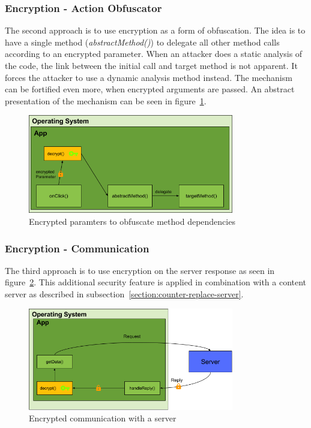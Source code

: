 \subsubsection{Encryption - Action Obfuscator} \label{subsubsectionection:counter-replace-encryption-content-obfuscator}
The second approach is to use encryption as a form of obfuscation.
The idea is to have a single method (\textit{abstractMethod()}) to delegate all other method calls according to an encrypted parameter.
\newline
When an attacker does a static analysis of the code, the link between the initial call and target method is not apparent.
It forces the attacker to use a dynamic analysis method instead.
The mechanism can be fortified even more, when encrypted arguments are passed.
\newline
An abstract presentation of the mechanism can be seen in figure~\ref{fig:encryptionAction}.
\begin{figure}[h]
    \centering
    \includegraphics[width=0.8\textwidth]{data/encryptionAction.png}
    \caption{Encrypted paramters to obfuscate method dependencies}
    \label{fig:encryptionAction}
\end{figure}

\subsubsection{Encryption - Communication} \label{section:counter-replace-encryption-content-communication}
The third approach is to use encryption on the server response as seen in figure~\ref{fig:encryptionComm}.
This additional security feature is applied in combination with a content server as described in subsection~\ref{section:counter-replace-server}.
\newline
\begin{figure}[h]
    \centering
    \includegraphics[width=0.8\textwidth]{data/encryptionComm.png}
    \caption{Encrypted communication with a server}
    \label{fig:encryptionComm}
\end{figure}
